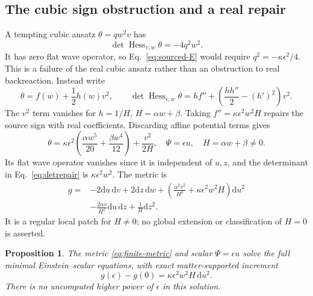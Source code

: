 \documentclass[11pt]{article}
\newcommand{\Hess}{\operatorname{Hess}}
\newcommand{\dd}{\mathrm d}
\newtheorem{proposition}{Proposition}
\begin{document}
\subsection{The cubic sign obstruction and a real repair}

A tempting cubic ansatz \(\theta=q w^2v\) has
\begin{equation}
 \det\Hess_{v,w}\theta=-4q^2w^2.
 \label{eq:cubic-obstruction}
\end{equation}
It has zero flat wave operator, so Eq.~\eqref{eq:sourced-E} would require \(q^2=-\kappa\epsilon^2/4\).
This is a failure of the real cubic ansatz rather than an obstruction to real backreaction.
Instead write
\begin{equation}
 \theta=f(w)+\frac12h(w)v^2,\qquad
 \det\Hess_{v,w}\theta
 =h f''+\left(\frac{hh''}{2}-(h')^2\right)v^2.
 \label{eq:detrepair}
\end{equation}
The \(v^2\) term vanishes for \(h=1/H\), \(H=\alpha w+\beta\).
Taking \(f''=\kappa\epsilon^2w^2H\) repairs the source sign with real coefficients.
Discarding affine potential terms gives
\begin{equation}
 \boxed{\theta=\kappa\epsilon^2\left(\frac{\alpha w^5}{20}
 +\frac{\beta w^4}{12}\right)+\frac{v^2}{2H},\quad
 \Psi=\epsilon u,\quad H=\alpha w+\beta\ne0.}
 \label{eq:finite-theta}
\end{equation}
Its flat wave operator vanishes since it is independent of \(u,z\), and the determinant in Eq.~\eqref{eq:detrepair} is \(\kappa\epsilon^2w^2\).
The metric is
\begin{equation}
 \boxed{\begin{aligned}
 g={}&-2\dd u\,\dd v+2\dd z\,\dd w
 +\left(\frac{\alpha^2v^2}{H^3}+\kappa\epsilon^2w^2H\right)\dd u^2\\
 &-\frac{2\alpha v}{H^2}\dd u\,\dd z+\frac1H\dd z^2.
 \end{aligned}}
 \label{eq:finite-metric}
\end{equation}
It is a regular local patch for \(H\ne0\); no global extension or classification of \(H=0\) is asserted.

\begin{proposition}
The metric \eqref{eq:finite-metric} and scalar \(\Psi=\epsilon u\) solve the full minimal Einstein--scalar equations, with exact matter-supported increment
\begin{equation}
 g(\epsilon)-g(0)=\kappa\epsilon^2w^2H\,\dd u^2.
 \label{eq:backreaction}
\end{equation}
There is no uncomputed higher power of \(\epsilon\) in this solution.
\end{proposition}
\end{document}
